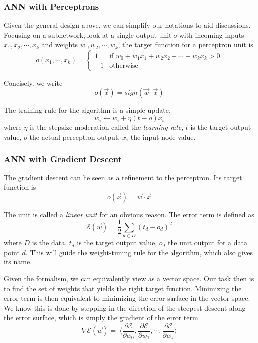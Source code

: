 \documentclass[12pt]{article}  %
\begin{document}
\subsubsection{ANN with Perceptrons}

Given the general design above, we can simplify our notations to aid discussions. Focusing on a subnetwork, look at a single output unit $o$ with incoming inputs $x_1, x_2, \cdots, x_k$ and weights $w_1, w_2, \cdots, w_k$, the target function for a perceptron unit is
\[
o(x_1, \cdots, x_k) =
\begin{cases}
1 &\text{if } w_0 + w_1 x_1 + w_2 x_2 + \cdots + w_k x_k > 0\\
-1 &\text{otherwise }
\end{cases}
\]

Concisely, we write $$o(\vec{x}) = sign(\vec{w} \cdot \vec{x})$$

The training rule for the algorithm is a simple update, $$w_i \leftarrow w_i + \eta(t-o)x_i$$ where $\eta$ is the stepsize moderation called the {\em learning rate}, $t$ is the target output value, $o$ the actual perceptron output, $x_i$ the input node value.




\subsubsection{ANN with Gradient Descent}

The gradient descent can be seen as a refinement to the perceptron. Its target function is $$o(\vec{x}) = \vec{w} \cdot \vec{x}$$

The unit is called a {\em linear unit} for an obvious reason. The error term is defined as $$\mathcal{E}(\vec{w}) = \frac{1}{2} \sum_{d \in D} (t_d - o_d)^2$$ where $D$ is the data, $t_d$ is the target output value, $o_d$ the unit output for a data point $d$. This will guide the weight-tuning rule for the algorithm, which also gives its name.

Given the formalism, we can equivalently view as a vector space. Our task then is to find the set of weights that yields the right target function. Minimizing the error term is then equivalent to minimizing the error surface in the vector space. We know this is done by stepping in the direction of the steepest descent along the error surface, which is simply the gradient of the error term $$\nabla \mathcal{E}(\vec{w}) =\ \langle  \frac{\partial \mathcal{E}}{\partial w_0}, \frac{\partial \mathcal{E}}{\partial w_1}, \cdots, \frac{\partial \mathcal{E}}{\partial w_k}  \rangle$$
\end{document}
